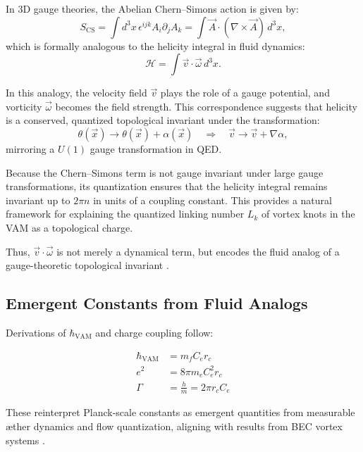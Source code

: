 In 3D gauge theories, the Abelian Chern--Simons action is given by:
\begin{equation}
S_{\text{CS}} = \int d^3x\, \epsilon^{ijk} A_i \partial_j A_k = \int \vec{A} \cdot (\nabla \times \vec{A})\, d^3x,
\end{equation}
which is formally analogous to the helicity integral in fluid dynamics:
\begin{equation}
\mathcal{H} = \int \vec{v} \cdot \vec{\omega}\, d^3x.
\end{equation}

In this analogy, the velocity field $\vec{v}$ plays the role of a gauge potential, and vorticity $\vec{\omega}$ becomes the field strength. This correspondence suggests that helicity is a conserved, quantized topological invariant under the transformation:
\begin{equation}
\theta(\vec{x}) \rightarrow \theta(\vec{x}) + \alpha(\vec{x}) \quad \Rightarrow \quad \vec{v} \rightarrow \vec{v} + \nabla \alpha,
\end{equation}
mirroring a $U(1)$ gauge transformation in QED.

Because the Chern--Simons term is not gauge invariant under large gauge transformations, its quantization ensures that the helicity integral remains invariant up to $2\pi n$ in units of a coupling constant. This provides a natural framework for explaining the quantized linking number $L_k$ of vortex knots in the VAM as a topological charge.

Thus, $\vec{v} \cdot \vec{\omega}$ is not merely a dynamical term, but encodes the fluid analog of a gauge-theoretic topological invariant \cite{moffatt1969degree, jackiw1990chern, verlinde2021qft}.


\subsection{Emergent Constants from Fluid Analogs}
Derivations of $\hbar_{\text{VAM}}$ and charge coupling follow:

\begin{align}
    \hbar_{\text{VAM}} &= m_f C_e r_c \\
    e^2 &= 8\pi m_e C_e^2 r_c \\
    \Gamma &= \frac{h}{m} = 2\pi r_c C_e
\end{align}

These reinterpret Planck-scale constants as emergent quantities from measurable æther dynamics and flow quantization, aligning with results from BEC vortex systems \cite{Pethick2008BEC, Donnelly1991QuantizedVortices}.

